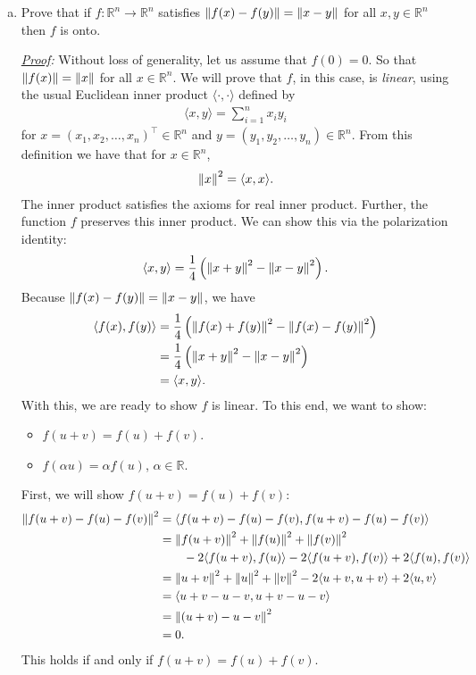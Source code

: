 \documentclass[11pt]{article}
\newcommand{\f}[2]{\frac{#1}{#2}}
\begin{document}
\begin{enumerate}[(a)]
	
	
	
	
	
	
	\item Prove that if $f: \mathbb{R}^n \to \mathbb{R}^n$ satisfies $\norm{f(x) - f(y)} = \norm{x-y}$ for all $x,y\in \mathbb{R}^n$ then $f$ is onto.
	
	
	\noindent \textit{\underline{Proof}:} Without loss of generality, let us assume that $f(0) = 0$. So that $\norm{f(x)} = \norm{x}$ for all $x\in \mathbb{R}^n$. We will prove that $f$, in this case, is \textit{linear}, using the usual Euclidean inner product $\langle \cdot, \cdot \rangle$ defined by
	\begin{align*}
	\langle x,y\rangle = \sum^n_{i=1}x_iy_i
	\end{align*}
	for $x = (x_1,x_2,\dots,x_n)^\top \in \mathbb{R}^n$ and $y = (y_1,y_2,\dots,y_n)\in \mathbb{R}^n$. From this definition we have that for $x\in \mathbb{R}^n$,
	\begin{align*}
	\norm{x}^2 = \langle x,x\rangle.
	\end{align*}
	The inner product satisfies the axioms for real inner product. Further, the function $f$ preserves this inner product. We can show this via the polarization identity:
	\begin{align*}
	\langle x,y\rangle = \f{1}{4}\left( \norm{x+y}^2 - \norm{x-y}^2  \right).
	\end{align*}
	Because $\norm{f(x)-f(y)} =\norm{x-y}$, we have
	\begin{align*}
	\langle f(x),f(y)\rangle &= \f{1}{4}\left( \norm{f(x)+f(y)}^2 - \norm{f(x)-f(y)}^2  \right)\\
	&= \f{1}{4}\left( \norm{x+y}^2 - \norm{x-y}^2  \right)\\
	&= \langle x,y\rangle.
	\end{align*}
	With this, we are ready to show $f$ is linear. To this end, we want to show:
	\begin{itemize}
		\item $f(u+v) = f(u) + f(v)$.
		\item $f(\alpha u) = \alpha f(u)$, $\alpha \in \mathbb{R}$. 
	\end{itemize}
	
	First, we will show $f(u+v) = f(u) + f(v)$:
	\begin{align*}
	\norm{ f(u+v) - f(u) - f(v)}^2 
	&= \langle f(u+v) - f(u) - f(v), f(u+v) - f(u) - f(v)\rangle\\
	&= \norm{f(u+v)}^2 + \norm{f(u)}^2 + \norm{f(v)}^2 \\
	&\qquad- 2\langle f(u+v),f(u)\rangle -2\langle f(u+v),f(v)\rangle +2\langle f(u),f(v) \rangle\\
	&= \norm{u+v}^2 + \norm{u}^2 + \norm{v}^2 -2\langle u+v,u+v\rangle +2\langle u,v\rangle\\
	&=\langle u+v -u-v, u+v-u-v\rangle\\
	&= \norm{(u+v) - u- v}^2\\
	&= 0.
  	\end{align*}   
	This holds if and only if $f(u+v) = f(u) + f(v)$.
	

\end{enumerate}
\end{document}
